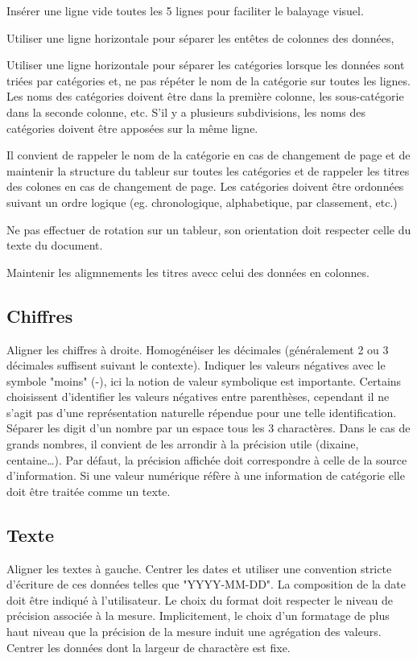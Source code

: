 \documentclass[a4paper,12pt]{article}
\begin{document}
\begin{multicols}{2}
Insérer une ligne vide toutes les 5 lignes pour faciliter le balayage visuel. \autocite{NFENISO9241-125ErgonomieLinteractionHommesysteme2017}

Utiliser une ligne horizontale pour séparer les entêtes de colonnes des données,

Utiliser une ligne horizontale pour séparer les catégories lorsque les données sont triées par catégories et, ne pas répéter le nom de la catégorie sur toutes les lignes. Les noms des catégories doivent être dans la première colonne, les sous-catégorie dans la seconde colonne, etc. S'il y a plusieurs subdivisions, les noms des catégories doivent être apposées sur la même ligne.

Il convient de rappeler le nom de la catégorie en cas de changement de page et de maintenir la structure du tableur sur toutes les catégories et de rappeler les titres des colones en cas de changement de page.
Les catégories doivent être ordonnées suivant un ordre logique (eg. chronologique, alphabetique, par classement, etc.)

Ne pas effectuer de rotation sur un tableur, son orientation doit respecter celle du texte du document.

Maintenir les aligmnements les titres avecc celui des données en colonnes.
\subsection*{Chiffres}
\label{sec:orgb455d09}
Aligner les chiffres à droite.
Homogénéiser les décimales (généralement 2 ou 3 décimales suffisent suivant le contexte).
Indiquer les valeurs négatives avec le symbole "moins" (-), ici la notion de valeur symbolique est importante. Certains choisissent d'identifier les valeurs négatives entre parenthèses, cependant il ne s'agit pas d'une représentation naturelle répendue pour une telle identification.
Séparer les digit d'un nombre par un espace tous les 3 charactères. Dans le cas de grands nombres, il convient de les arrondir à la précision utile (dixaine, centaine\ldots{}). Par défaut, la précision affichée doit correspondre à celle de la source d'information.
Si une valeur numérique réfère à une information de catégorie elle doit être traitée comme un texte.
\subsection*{Texte}
\label{sec:org3795c15}
Aligner les textes à gauche.
Centrer les dates et utiliser une convention stricte d'écriture de ces données telles que "YYYY-MM-DD". \autocite{ISO8601-1DateHeureRepresentations2019} La composition de la date doit être indiqué à l'utilisateur. Le choix du format doit respecter le niveau de précision associée à la mesure. Implicitement, le choix d'un formatage de plus haut niveau que la précision de la mesure induit une agrégation des valeurs.
Centrer les données dont la largeur de charactère est fixe.

\end{multicols}
\end{document}
